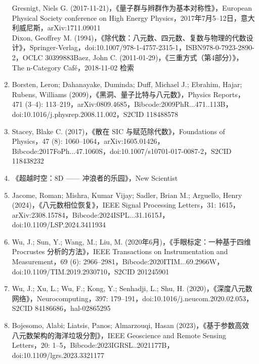\begin{enumerate}
Gresnigt, Niels G. (2017-11-21)，《量子群与辫群作为基本对称性》，European Physical Society conference on High Energy Physics，2017年7月5–12日，意大利威尼斯，arXiv:1711.09011\\
Dixon, Geoffrey M. (1994)，《除代数：八元数、四元数、复数与物理的代数设计》，Springer-Verlag，doi:10.1007/978-1-4757-2315-1，ISBN978-0-7923-2890-2，OCLC 30399883Baez, John C. (2011-01-29)，《三重方式（第4部分）》，The n-Category Café，2018-11-02 检索
\item Borsten, Leron; Dahanayake, Duminda; Duff, Michael J.; Ebrahim, Hajar; Rubens, Williams (2009)，《黑洞、量子比特与八元数》，Physics Reports，471 (3–4): 113–219，arXiv:0809.4685，Bibcode:2009PhR...471..113B，doi:10.1016/j.physrep.2008.11.002，S2CID 118488578
\item Stacey, Blake C. (2017)，《散在 SIC 与赋范除代数》，Foundations of Physics，47 (8): 1060–1064，arXiv:1605.01426，Bibcode:2017FoPh...47.1060S，doi:10.1007/s10701-017-0087-2，S2CID 118438232
\item 《超越时空：8D —— 冲浪者的乐园》，New Scientist
\item Jacome, Roman; Mishra, Kumar Vijay; Sadler, Brian M.; Arguello, Henry (2024)，《八元数相位恢复》，IEEE Signal Processing Letters，31: 1615，arXiv:2308.15784，Bibcode:2024ISPL...31.1615J，doi:10.1109/LSP.2024.3411934
\item Wu, J.; Sun, Y.; Wang, M.; Liu, M. (2020年6月)，《手眼标定：一种基于四维 Procrustes 分析的方法》，IEEE Transactions on Instrumentation and Measurement，69 (6): 2966–2981，Bibcode:2020ITIM...69.2966W，doi:10.1109/TIM.2019.2930710，S2CID 201245901
\item Wu, J.; Xu, L.; Wu, F.; Kong, Y.; Senhadji, L.; Shu, H. (2020)，《深度八元数网络》，Neurocomputing，397: 179–191，doi:10.1016/j.neucom.2020.02.053，S2CID 84186686，hal-02865295
\item Bojesomo, Alabi; Liatsis, Panos; Almarzouqi, Hasan (2023)，《基于参数高效八元数架构的海洋垃圾分割》，IEEE Geoscience and Remote Sensing Letters，20: 1–5，Bibcode:2023IGRSL..2021177B，doi:10.1109/lgrs.2023.3321177
\end{enumerate}
